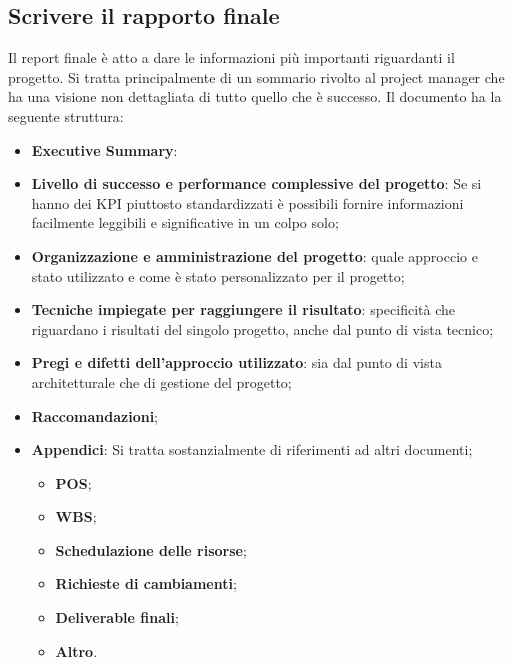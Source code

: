 \subsection{Scrivere il rapporto finale}
Il report finale è atto a dare le informazioni più importanti riguardanti il progetto. Si tratta principalmente di un sommario rivolto al project manager che ha una visione non dettagliata di tutto quello che è successo. Il documento ha la seguente struttura:
\begin{itemize}
	\item \textbf{Executive Summary}:
	\item \textbf{Livello di successo e performance complessive del progetto}: Se si hanno dei KPI piuttosto standardizzati è possibili fornire informazioni facilmente leggibili e significative in un colpo solo;
	\item \textbf{Organizzazione e amministrazione del progetto}: quale approccio e stato utilizzato e come è stato personalizzato per il progetto;
	\item \textbf{Tecniche impiegate per raggiungere il risultato}: specificità che riguardano i risultati del singolo progetto, anche dal punto di vista tecnico;
	\item \textbf{Pregi e difetti dell’approccio utilizzato}: sia dal punto di vista architetturale che di gestione del progetto;
	\item \textbf{Raccomandazioni};
	\item \textbf{Appendici}: Si tratta sostanzialmente di riferimenti ad altri documenti;
	\begin{itemize}
		\item \textbf{POS};
		\item \textbf{WBS};
		\item \textbf{Schedulazione delle risorse};
		\item \textbf{Richieste di cambiamenti};
		\item \textbf{Deliverable finali};
		\item \textbf{Altro}.
	\end{itemize}
\end{itemize}
